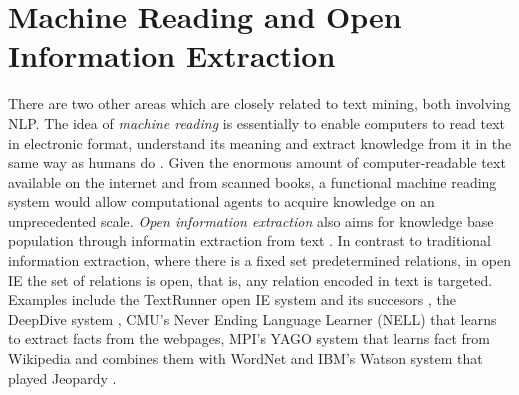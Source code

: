 \section{Machine Reading and Open Information Extraction}

There are two other areas which are closely related to text mining, both involving NLP.
The idea of \emph{machine reading} is essentially to enable computers to read text in electronic format, understand its meaning and extract knowledge from it in the same way as humans do \citep{Mitchell2005Reading}.
Given the enormous amount of computer-readable text available on the internet and from scanned books, a functional machine reading system would allow computational agents to acquire knowledge on an unprecedented scale.
\emph{Open information extraction} also aims for knowledge base population through informatin extraction from text \citet{banko2007open,Etzioni2011Search}.
In contrast to traditional information extraction, where there is a fixed set predetermined relations, in open IE the set of relations is open, that is, any relation encoded in text is targeted.  
Examples include the TextRunner open IE system and its succesors \citep{yates2007textrunner}, the DeepDive system \citep{niu2012deepdive}, CMU's Never Ending Language Learner (NELL) \citep{carlson-aaai} that learns to extract facts from the webpages,  MPI's YAGO system that learns fact from Wikipedia and combines them with WordNet \citep{YAGO} and IBM's Watson system that played Jeopardy \citep{fan2012automatic}.




 